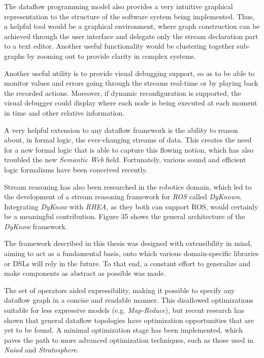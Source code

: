 \documentclass{dithesis}
\begin{document}

The dataflow programming model also provides a very intuitive graphical representation to the structure of the software system being implemented. Thus, a helpful tool would be a graphical environment, where graph construction can be achieved through the user interface and delegate only the stream declaration part to a text editor. Another useful functionality would be clustering together sub-graphs by zooming out to provide clarity in complex systems.

Another useful utility is to provide visual debugging support, so as to be able to monitor values and errors going through the streams real-time or by playing back the recorded actions. Moreover, if dynamic reconfiguration is supported, the visual debugger could display where each node is being executed at each moment in time and other relative information.


A very helpful extension to any dataflow framework is the ability to reason about, in formal logic, the ever-changing streams of data. This creates the need for a new formal logic that is able to capture this flowing notion, which has also troubled the new \textit{Semantic Web} field\cite{streaming_world}. Fortunately, various sound and efficient logic formalisms have been conceived recently\cite{pdt_logic,asp}.

Stream reasoning has also been researched in the robotics domain\cite{robot_reasoning}, which led to the development of a stream reasoning framework for \textit{ROS} called \textit{DyKnown}\cite{stream_reasoning}. Integrating \textit{DyKnow} with \textit{RHEA}, as they both can support ROS, would certainly be a meaningful contribution. Figure 35 shows the general architecture of the \textit{DyKnow} framework.



The framework described in this thesis was designed with extensibility in mind, aiming to act as a fundamental basis, onto which various domain-specific libraries or DSLs will rely in the future. To that end, a constant effort to generalize and make components as abstract as possible was made. 

The set of operators aided expressibility, making it possible to specify any dataflow graph in a concise and readable manner. This disallowed optimizations suitable for less expressive models (e.g. \textit{Map-Reduce}), but recent research has shown that general dataflow topologies have optimization opportunities that are yet to be found\cite{blackbox}. A minimal optimization stage has been implemented, which paves the path to more advanced optimization techniques, such as those used in \textit{Naiad}\cite{naiad} and \textit{Stratosphere}\cite{static_analysis}.
\end{document}
